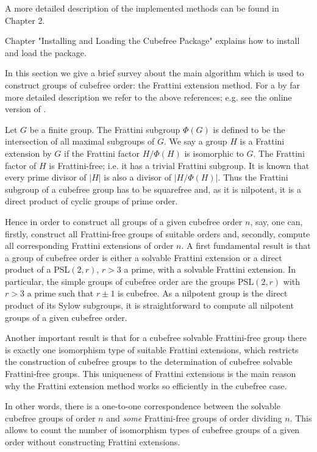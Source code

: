A more detailed description of the implemented methods can be found in Chapter 2.

Chapter "Installing and Loading the Cubefree Package" explains
how to install and load the {\Cubefree} package.



In this section we give a brief survey about the main algorithm which is used
to construct groups of cubefree order: the Frattini extension method. For a by
far more detailed description
we refer to the above references; e.g. see the online version of \cite{Di05}.

Let $G$ be a finite group. The Frattini subgroup $\Phi(G)$ is defined to be
the intersection of all maximal subgroups of $G$. We say a group $H$ is a
Frattini extension by $G$ if the Frattini factor $H/\Phi(H)$ is isomorphic to
$G$. The Frattini factor of $H$ is Frattini-free; i.e. it has a trivial
Frattini subgroup. It is known that every prime divisor of $|H|$ is also a divisor of
$|H/\Phi(H)|$. Thus the Frattini subgroup of a cubefree group has to be
squarefree and, as it is nilpotent, it is a direct product of cyclic groups of
prime order.

Hence in order to construct all groups of a given cubefree order $n$, say, one can,
firstly, construct all Frattini-free groups of suitable orders and, secondly, compute
all corresponding Frattini extensions of order $n$. A first fundamental result
is that  a group of cubefree order is either a solvable Frattini
extension or a direct product of a PSL$(2,r)$, $r>3$ a prime, with a solvable
Frattini extension. In particular, the simple groups of cubefree
order are the groups PSL$(2,r)$ with $r>3$ a prime such that $r\pm
1$ is cubefree. As a nilpotent group is the direct product of its Sylow subgroups, it
is straightforward to compute all nilpotent groups of a given cubefree order.

Another important result is
that for a cubefree solvable Frattini-free group there is exactly one isomorphism
type of suitable Frattini extensions, which restricts the construction of
cubefree groups to the
determination of cubefree solvable
Frattini-free groups.  This uniqueness of Frattini extensions is the
main reason why the Frattini extension method works so efficiently in the
cubefree case. 

In other words, there is a one-to-one correspondence between
the solvable cubefree groups of order $n$ and {\it some} Frattini-free groups of order
dividing $n$. This allows to count the number of isomorphism types of cubefree groups of a given
order without
constructing Frattini extensions.

